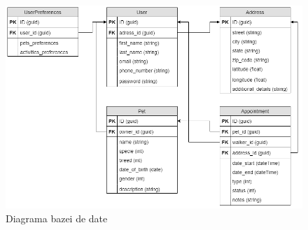 \begin{figure}[ht]
    \centering
    \includegraphics[width=1\textwidth] {images/database.png}
    \caption{Diagrama bazei de date}
    \label{fig:database}
\end{figure}